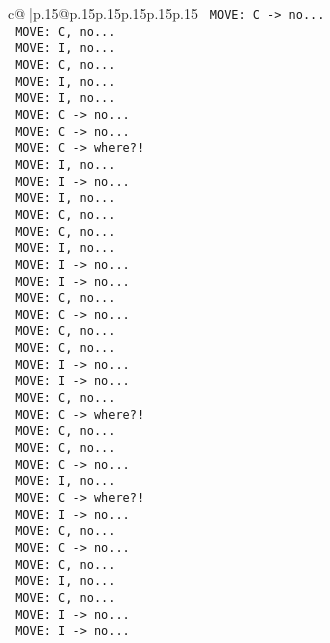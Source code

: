 \documentclass{article}
\begin{document}
{\begin{supertabular}{c@{$\;$}|p{.15\linewidth}@{}p{.15\linewidth}p{.15\linewidth}p{.15\linewidth}p{.15\linewidth}p{.15\linewidth}}
{{{\texttt{ MOVE: C {-}> no...} \\
\texttt{ MOVE: C, no...} \\
\texttt{ MOVE: I, no...} \\
\texttt{ MOVE: C, no...} \\
\texttt{ MOVE: I, no...} \\
\texttt{ MOVE: I, no...} \\
\texttt{ MOVE: C {-}> no...} \\
\texttt{ MOVE: C {-}> no...} \\
\texttt{ MOVE: C {-}> where?!} \\
\texttt{ MOVE: I, no...} \\
\texttt{ MOVE: I {-}> no...} \\
\texttt{ MOVE: I, no...} \\
\texttt{ MOVE: C, no...} \\
\texttt{ MOVE: C, no...} \\
\texttt{ MOVE: I, no...} \\
\texttt{ MOVE: I {-}> no...} \\
\texttt{ MOVE: I {-}> no...} \\
\texttt{ MOVE: C, no...} \\
\texttt{ MOVE: C {-}> no...} \\
\texttt{ MOVE: C, no...} \\
\texttt{ MOVE: C, no...} \\
\texttt{ MOVE: I {-}> no...} \\
\texttt{ MOVE: I {-}> no...} \\
\texttt{ MOVE: C, no...} \\
\texttt{ MOVE: C {-}> where?!} \\
\texttt{ MOVE: C, no...} \\
\texttt{ MOVE: C, no...} \\
\texttt{ MOVE: C {-}> no...} \\
\texttt{ MOVE: I, no...} \\
\texttt{ MOVE: C {-}> where?!} \\
\texttt{ MOVE: I {-}> no...} \\
\texttt{ MOVE: C, no...} \\
\texttt{ MOVE: C {-}> no...} \\
\texttt{ MOVE: C, no...} \\
\texttt{ MOVE: I, no...} \\
\texttt{ MOVE: C, no...} \\
\texttt{ MOVE: I {-}> no...} \\
\texttt{ MOVE: I {-}> no...} \\
}}}
\end{supertabular}}
\end{document}
